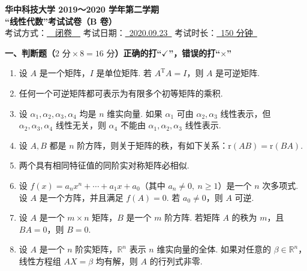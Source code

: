 \documentclass[a4paper,11pt]{ctexart}
\newcommand{\rk}{\mathrm{r}}
\newcommand{\T}{\mathrm{T}}
\begin{document}
\begin{center}
  {\Large\bfseries 华中科技大学 2019～2020 学年第二学期}\\[0.4em]
  {\Large\bfseries “线性代数”考试试卷（B 卷）}\\[1.0em]
  {\normalsize
    考试方式：\underline{\ \ 闭卷\ \ }\quad
    考试日期：\underline{\ 2020.09.23\ }\quad
    考试时长：\underline{\ 150 分钟\ }
  }
\end{center}

\vspace{0.8em}

\textbf{一、判断题（$2\text{ 分}\times 8 = 16\text{ 分}$）正确的打“$\checkmark$”，错误的打“$\times$”}

\begin{enumerate}[label={(\quad)\ \arabic*.}, leftmargin=3.8em, itemsep=0.55em, topsep=0.6em]
  \item 设 $A$ 是一个矩阵，$I$ 是单位矩阵. 若 $A^{\T} A = I$，则 $A$ 是可逆矩阵.

  \item 任何一个可逆矩阵都可表示为有限多个初等矩阵的乘积.

  \item 设 $\alpha_1, \alpha_2, \alpha_3, \alpha_4$ 均是 $n$ 维实向量. 如果 $\alpha_1$ 可由 $\alpha_2, \alpha_3$ 线性表示，但 $\alpha_2, \alpha_3, \alpha_4$ 线性无关，则 $\alpha_4$ 不能由 $\alpha_1, \alpha_2, \alpha_3$ 线性表示.

  \item 设 $A, B$ 都是 $n$ 阶方阵，则关于矩阵的秩，有如下关系：$\rk(AB) = \rk(BA)$.

  \item 两个具有相同特征值的同阶实对称矩阵必相似.

  \item 设 $f(x) = a_n x^n + \cdots + a_1 x + a_0$（其中 $a_n \neq 0,\ n \ge 1$）是一个 $n$ 次多项式. 设 $A$ 是一个方阵，并且满足 $f(A) = 0$. 若 $a_0 \neq 0$，则 $A$ 可逆.

  \item 设 $A$ 是一个 $m \times n$ 矩阵，$B$ 是一个 $m$ 阶方阵. 若矩阵 $A$ 的秩为 $m$，且 $BA = 0$，则 $B = 0$.

  \item 设 $A$ 是一个 $n$ 阶实矩阵，$\mathbb{R}^n$ 表示 $n$ 维实向量的全体. 如果对任意的 $\beta \in \mathbb{R}^n$，线性方程组 $AX = \beta$ 均有解，则 $A$ 的行列式非零.
\end{enumerate}

\vspace{1.0em}
\end{document}
